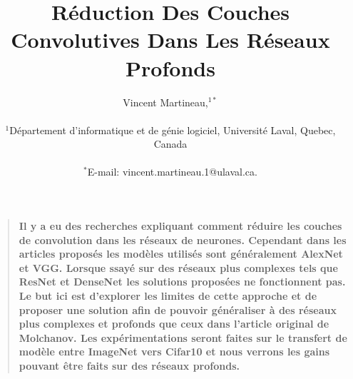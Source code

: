 \documentclass[12pt]{article}
\title{Réduction Des Couches Convolutives Dans Les Réseaux Profonds}
\author
{Vincent Martineau,$^{1\ast}$\\
\\
\normalsize{$^{1}$Département d'informatique et de génie logiciel, Université Laval, Quebec, Canada}\\
\\
\normalsize{$^\ast$E-mail:  vincent.martineau.1@ulaval.ca.}
}
\date{}
\newenvironment{sciabstract}{%
\begin{quote} \bf}
{\end{quote}}
\begin{document}
 


\baselineskip24pt


\maketitle 




\begin{sciabstract}
  Il y a eu des recherches expliquant comment réduire les couches de convolution dans les réseaux de neurones. Cependant dans les articles proposés les modèles utilisés sont généralement AlexNet et VGG. Lorsque ssayé sur des réseaux plus complexes tels que ResNet et DenseNet les solutions proposées ne fonctionnent pas. Le but ici est d'explorer les limites de cette approche et de proposer une solution afin de pouvoir généraliser à des réseaux plus complexes et profonds que ceux dans l'article original de Molchanov. Les expérimentations seront faites sur le transfert de modèle entre ImageNet vers Cifar10 et nous verrons les gains pouvant être faits sur des réseaux profonds. 
\end{sciabstract}



\end{document}
